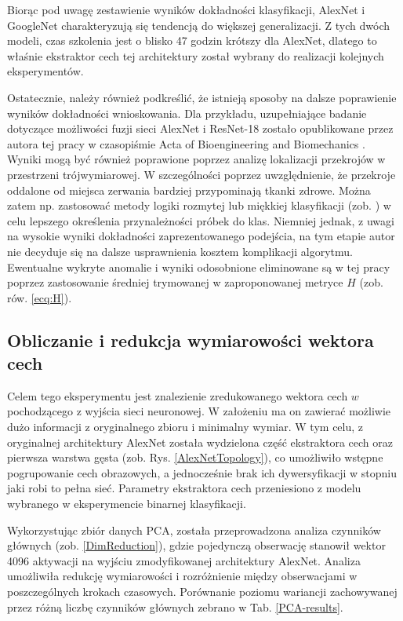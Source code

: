 Biorąc pod uwagę zestawienie wyników dokładności klasyfikacji, AlexNet i GoogleNet charakteryzują się tendencją do większej generalizacji. Z tych dwóch modeli, czas szkolenia jest o blisko 47 godzin krótszy dla AlexNet, dlatego to właśnie ekstraktor cech tej architektury został wybrany do realizacji kolejnych eksperymentów. 

Ostatecznie, należy również podkreślić, że istnieją sposoby na dalsze poprawienie wyników dokładności wnioskowania. Dla przykładu, uzupełniające badanie dotyczące możliwości fuzji sieci AlexNet i ResNet-18 zostało opublikowane przez autora tej pracy w czasopiśmie Acta of Bioengineering and Biomechanics \cite{Kapinski19}. Wyniki mogą być również poprawione poprzez analizę lokalizacji przekrojów w przestrzeni trójwymiarowej. W szczególności poprzez uwzględnienie, że przekroje oddalone od miejsca zerwania bardziej przypominają tkanki zdrowe. Można zatem np. zastosować metody logiki rozmytej lub miękkiej klasyfikacji (zob. \cite{Liu2011}) w celu lepszego określenia przynależności próbek do klas. Niemniej jednak, z uwagi na wysokie wyniki dokładności zaprezentowanego podejścia, na tym etapie autor nie decyduje się na dalsze usprawnienia kosztem komplikacji algorytmu. Ewentualne wykryte anomalie i wyniki odosobnione eliminowane są w tej pracy poprzez zastosowanie średniej trymowanej w zaproponowanej metryce $H$ (zob. rów. \ref{ecq:H}).

\subsection{Obliczanie i redukcja wymiarowości wektora cech}

Celem tego eksperymentu jest znalezienie zredukowanego wektora cech $w$ pochodzącego z wyjścia sieci neuronowej. W założeniu ma on zawierać możliwie dużo informacji z oryginalnego zbioru i minimalny wymiar. W tym celu, z oryginalnej architektury AlexNet została wydzielona część ekstraktora cech oraz pierwsza warstwa gęsta (zob. Rys. \ref{AlexNetTopology}), co umożliwiło wstępne pogrupowanie cech obrazowych, a jednocześnie brak ich dywersyfikacji w stopniu jaki robi to pełna sieć. Parametry ekstraktora cech przeniesiono z modelu wybranego w eksperymencie binarnej klasyfikacji. 

Wykorzystując zbiór danych PCA, została przeprowadzona analiza czynników głównych (zob. \ref{DimReduction}), gdzie pojedynczą obserwację stanowił wektor 4096 aktywacji na wyjściu zmodyfikowanej architektury AlexNet. Analiza umożliwiła redukcję wymiarowości i rozróżnienie między obserwacjami w poszczególnych krokach czasowych. Porównanie poziomu wariancji zachowywanej przez różną liczbę czynników głównych zebrano w Tab. \ref{PCA-results}.


